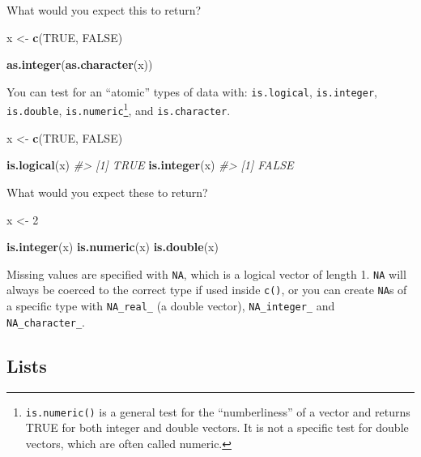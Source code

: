 \documentclass[]{book}
\newenvironment{Shaded}{\begin{snugshade}}{\end{snugshade}}
\newcommand{\KeywordTok}[1]{\textcolor[rgb]{0.13,0.29,0.53}{\textbf{#1}}}
\newcommand{\DecValTok}[1]{\textcolor[rgb]{0.00,0.00,0.81}{#1}}
\newcommand{\StringTok}[1]{\textcolor[rgb]{0.31,0.60,0.02}{#1}}
\newcommand{\CommentTok}[1]{\textcolor[rgb]{0.56,0.35,0.01}{\textit{#1}}}
\newcommand{\OtherTok}[1]{\textcolor[rgb]{0.56,0.35,0.01}{#1}}
\newcommand{\NormalTok}[1]{#1}
\let\rmarkdownfootnote\footnote%
\def\footnote{\protect\rmarkdownfootnote}
\theoremstyle{definition}
\theoremstyle{definition}
\theoremstyle{definition}
\theoremstyle{remark}
\begin{document}
What would you expect this to return?

\begin{Shaded}
\begin{Highlighting}[]
\NormalTok{x <-}\StringTok{ }\KeywordTok{c}\NormalTok{(}\OtherTok{TRUE}\NormalTok{, }\OtherTok{FALSE}\NormalTok{)}

\KeywordTok{as.integer}\NormalTok{(}\KeywordTok{as.character}\NormalTok{(x))}
\end{Highlighting}
\end{Shaded}

You can test for an ``atomic'' types of data with: \texttt{is.logical},
\texttt{is.integer}, \texttt{is.double}, \texttt{is.numeric}\footnote{\texttt{is.numeric()}
  is a general test for the ``numberliness'' of a vector and returns
  TRUE for both integer and double vectors. It is not a specific test
  for double vectors, which are often called numeric.}, and
\texttt{is.character}.

\begin{Shaded}
\begin{Highlighting}[]
\NormalTok{x <-}\StringTok{ }\KeywordTok{c}\NormalTok{(}\OtherTok{TRUE}\NormalTok{, }\OtherTok{FALSE}\NormalTok{)}

\KeywordTok{is.logical}\NormalTok{(x)}
\CommentTok{#> [1] TRUE}
\KeywordTok{is.integer}\NormalTok{(x)}
\CommentTok{#> [1] FALSE}
\end{Highlighting}
\end{Shaded}

What would you expect these to return?

\begin{Shaded}
\begin{Highlighting}[]
\NormalTok{x <-}\StringTok{ }\DecValTok{2}

\KeywordTok{is.integer}\NormalTok{(x)}
\KeywordTok{is.numeric}\NormalTok{(x)}
\KeywordTok{is.double}\NormalTok{(x)}
\end{Highlighting}
\end{Shaded}

Missing values are specified with \texttt{NA}, which is a logical vector
of length 1. \texttt{NA} will always be coerced to the correct type if
used inside \texttt{c()}, or you can create \texttt{NA}s of a specific
type with \texttt{NA\_real\_} (a double vector), \texttt{NA\_integer\_}
and \texttt{NA\_character\_}.

\subsection{Lists}\label{lists}
\end{document}
